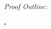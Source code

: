 \documentclass[12pt]{article}
\theoremstyle{definition}
\newenvironment{proofoutline}{\noindent\emph{Proof Outline:}}{\hfill$\square$}
\newcommand{\COE}[2]{CO^{#1}_{e}(#2)}
\begin{document}
\begin{proofoutline}
















 





\end{proofoutline}
\end{document}

